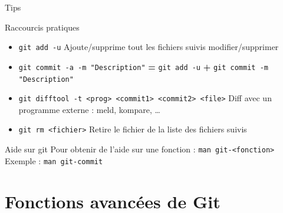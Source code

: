 \documentclass{beamer}
\begin{document}
\begin{frame}[fragile]{Tips}
  \begin{block}{Raccourcis pratiques}
    \begin{itemize}
    \item \textcolor{commandcolor}{\verb?git add -u?}\linebreak
      Ajoute/supprime tout les fichiers suivis modifier/supprimer
    \item \textcolor{commandcolor}{\verb?git commit -a -m "Description"?}\linebreak
      \textbf{=} \textcolor{commandcolor}{\verb?git add -u?} \textbf{+} \textcolor{commandcolor}{\verb?git commit -m "Description"?}
    \item \textcolor{commandcolor}{\verb?git difftool -t <prog> <commit1> <commit2> <file>?}\linebreak
      Diff avec un programme externe : meld, kompare, \dots
    \item \textcolor{commandcolor}{\verb?git rm <fichier>?}\linebreak
      Retire le fichier de la liste des fichiers suivis
    \end{itemize}
  \end{block}  
  
  \begin{alertblock}{Aide sur git}
    Pour obtenir de l'aide sur une fonction :\linebreak
    \textcolor{commandcolor}{\verb?man git-<fonction>?}\linebreak
    Exemple : 
    \textcolor{commandcolor}{\verb?man git-commit?}
  \end{alertblock}
  
\end{frame}

\section{Fonctions avancées de Git}
\subsection{}
\end{document}
